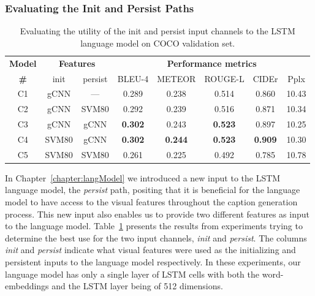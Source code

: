 \subsubsection{Evaluating the Init and Persist Paths}
\label{subsubsec:InitVpersist}
\begin{table}[htp]
  \centering
  \newcommand{\bs}{\small}
  \begin{adjustbox}{center}
  \begin{tabular}{|c||c|c||c|c|c|c|c|}
    \hline
    \bf Model & \multicolumn{2}{c||}{\bf Features 
    } & \multicolumn{5}{c|}{\bf Performance metrics}\\
     \cline{2-8}
    \bf \# & init & persist &\bs BLEU-4 &\bs METEOR &\bs ROUGE-L &\bs CIDEr&\bs Pplx \\\hline
    C1 & gCNN  & ---  & 0.289 & 0.238 & 0.514 & 0.860 & 10.43  \\
    C2 & gCNN  & SVM80& 0.292 & 0.239 & 0.516 & 0.871 & 10.34  \\
    C3 & gCNN  & gCNN &\bf 0.302 & 0.243 &\bf 0.523 & 0.897 & 10.25  \\
    C4 & SVM80 & gCNN &\bf 0.302 &\bf0.244 &\bf 0.523 &\bf0.909 & 10.30  \\
    C5 & SVM80 & SVM80& 0.261 & 0.225 & 0.492 & 0.785 & 10.78 \\\hline
  \end{tabular}
  \end{adjustbox}
  \caption{Evaluating the utility of the init and persist input channels to the
          LSTM language model on COCO validation set.}
  \label{tab:resCocInitVPers}
\end{table}

In Chapter~\ref{chapter:langModel} we introduced a new input to the LSTM language
model, the \emph{persist} path, positing that it is beneficial for the language
model to have access to the visual features throughout the caption generation
process.
This new input also enables us to provide two different features as input to the
language model.
Table~\ref{tab:resCocInitVPers} presents the results from experiments trying to
determine the best use for the two input channels, \emph{init} and
\emph{persist}.
The columns \emph{init} and \emph{persist} indicate what visual features were
used as the initializing and persistent inputs to the language model
respectively.
In these experiments, our language model has only a single layer of LSTM cells
with both the word-embeddings and the LSTM layer being of 512 dimensions.

